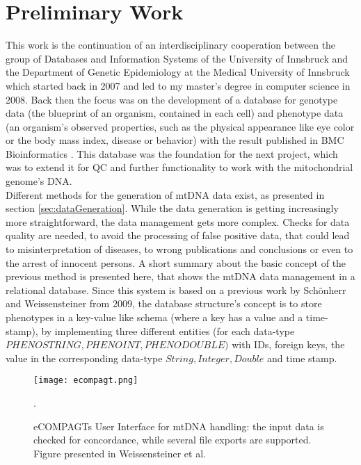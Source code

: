 \section{Preliminary Work}
\label{prelimWork}
This work is the continuation of an interdisciplinary cooperation between the group of Databases and Information Systems of the University of Innsbruck and the Department of Genetic Epidemiology at the Medical University of Innsbruck which started back in 2007 and led to my master's degree in computer science in 2008. Back then the focus was on the development of a database for genotype data (the blueprint of an organism, contained in each cell) and phenotype data (an organism's observed properties, such as the physical appearance like eye color or the body mass index, disease or behavior) with the result published in BMC Bioinformatics \cite{Schoenherr2009}. This database was the foundation for the next project, which was to extend it for QC and further functionality to work with the mitochondrial genome's DNA. 
\\
Different methods for the generation of mtDNA data exist, as presented in section \ref{sec:dataGeneration}. While the data generation is getting increasingly more straightforward, the data management gets more complex. Checks for data quality are needed, to avoid the processing of false positive data, that could lead to misinterpretation of diseases, to wrong publications and conclusions or even to the arrest of innocent persons.
A short summary about the basic concept of the previous method is presented here, that shows the mtDNA data management in a relational database. Since this system is based on a previous work by Sch\"onherr and Weissensteiner \cite{Schoenherr2009} from 2009, the database structure's concept is to store phenotypes in a key-value like schema (where a key has a value and a time-stamp), by implementing three different entities (for each data-type $PHENOSTRING, PHENOINT, PHENODOUBLE)$ with IDs, foreign keys, the value in the corresponding data-type $String, Integer, Double$ and time stamp.
\begin{figure}[ht]
\begin{center}
\texttt{[image: ecompagt.png]}
\caption[eCOMPAGTs User Interface]{eCOMPAGTs User Interface for mtDNA handling: the input data is checked for concordance, while several file exports are supported. Figure presented in Weissensteiner et al. \cite{Weissensteiner2010}}.
\label{fig:ecompagt}
\end{center}
\end{figure}
